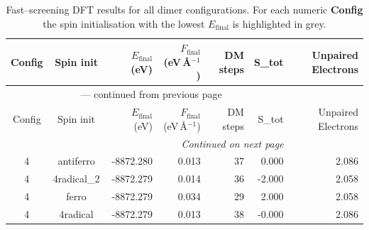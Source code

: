 
\begin{longtable}{@{}ccrrrrr@{}}
\caption{Fast–screening DFT results for all dimer configurations.
         For each numeric \textbf{Config} the spin initialisation with the
         lowest $E_{\mathrm{final}}$ is highlighted in grey.}\label{tab:dimer_full}\\
\toprule
Config & Spin init & $E_{\mathrm{final}}$ (eV) &
$F_{\mathrm{final}}$ (eV\,\AA$^{-1}$) & DM steps & S_{tot} & Unpaired Electrons\\
\midrule
\endfirsthead
\multicolumn{6}{c}{{\tablename}~\thetable{} — continued from previous page}\\
\toprule
Config & Spin init & $E_{\mathrm{final}}$ (eV) &
$F_{\mathrm{final}}$ (eV\,\AA$^{-1}$) & DM steps & S_{tot} & Unpaired Electrons\\
\midrule
\endhead
\midrule
\multicolumn{6}{r}{\emph{Continued on next page}}\\
\endfoot
\bottomrule
\endlastfoot
\rowcolor{gray!20} 4 & antiferro & -8872.280 & 0.013 & 37 & 0.000 & 2.086 \\
4 & 4radical\_2 & -8872.279 & 0.014 & 36 & -2.000 & 2.058 \\
4 & ferro & -8872.279 & 0.034 & 29 & 2.000 & 2.058 \\
4 & 4radical & -8872.279 & 0.013 & 38 & -0.000 & 2.086 \\
\end{longtable}
